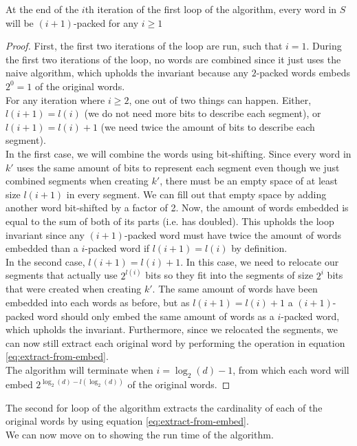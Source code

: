 \begin{invariant}
    At the end of the $i$th iteration of the first loop of the algorithm, every word in $S$ will be $(i+1)$-packed for any $i \geq 1$
\end{invariant}
\begin{proof}
    First, the first two iterations of the loop are run, such that $i=1$. During the first two iterations of the loop, no words are combined since it just uses the naive algorithm, which upholds the invariant because any $2$-packed words embeds $2^{0}=1$ of the original words.\\
    For any iteration where $i\geq 2$, one out of two things can happen. Either, $l(i+1) = l(i)$ (we do not need more bits to describe each segment), or $l(i + 1) = l(i) + 1$ (we need twice the amount of bits to describe each segment).\\
    In the first case, we will combine the words using bit-shifting. Since every word in $k'$ uses the same amount of bits to represent each segment even though we just combined segments when creating $k'$, there must be an empty space of at least size $l(i+1)$ in every segment. We can fill out that empty space by adding another word bit-shifted by a factor of 2. %
    Now, the amount of words embedded is equal to the sum of both of its parts (i.e. has doubled). This upholds the loop invariant since any $(i+1)$-packed word must have twice the amount of words embedded than a $i$-packed word if $l(i+1) = l(i)$ by definition.\\
    In the second case, $l(i + 1) = l(i) + 1$. In this case, we need to relocate our segments that actually use $2^{l(i)}$ bits so they fit into the segments of size $2^i$ bits that were created when creating $k'$.
    The same amount of words have been embedded into each words as before, but as $l(i+1) = l(i) + 1$ a $(i+1)$-packed word should only embed the same amount of words as a $i$-packed word, which upholds the invariant.
    Furthermore, since we relocated the segments, we can now still extract each original word by performing the operation in equation \ref{eq:extract-from-embed}.\\
    The algorithm will terminate when $i = \log_2(d) - 1$, from which each word will embed $2^{\log_2(d)-l(\log_2(d))}$ of the original words.
\end{proof}

The second for loop of the algorithm extracts the cardinality of each of the original words by using equation \ref{eq:extract-from-embed}.\\
We can now move on to showing the run time of the algorithm.
